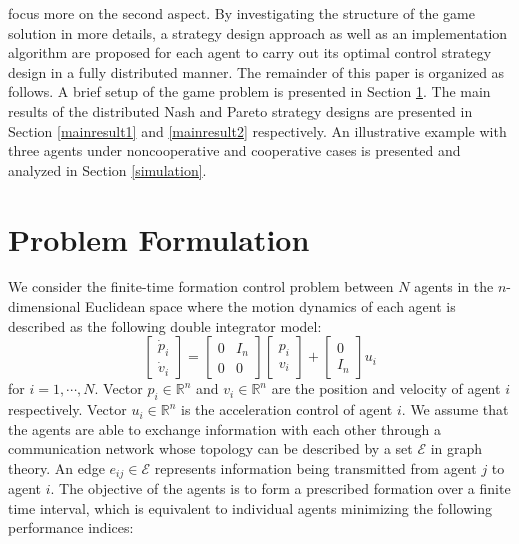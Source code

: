 \documentclass[12pt,draftcls,onecolumn]{IEEEtran}  %
\begin{document}
focus more on the second aspect. By investigating the structure of the game solution in more details, a strategy design approach as well as {an} implementation algorithm {are} proposed for each agent to carry out its optimal control strategy design in a fully distributed manner. The {remainder} of this paper is organized as follows. A brief setup of the game {problem} is presented in Section \ref{setup}. The main results of the distributed Nash and Pareto strategy {designs} are presented in Section \ref{mainresult1} and \ref{mainresult2} {respectively}. An illustrative example with three agents under noncooperative and cooperative cases is presented and analyzed in Section \ref{simulation}.


\section{Problem Formulation}\label{setup}
We consider the {finite-time} formation control problem between $N$ agents in the $n$-dimensional Euclidean space where the motion dynamics of each agent is described as the following double integrator model:
\begin{equation}
\begin{bmatrix}
\dot{p}_i\\ \dot{v}_i
\end{bmatrix}=\begin{bmatrix}
0&I_n\\0&0
\end{bmatrix}\begin{bmatrix}
p_i\\
v_i\end{bmatrix}+\begin{bmatrix}
0\\ I_n
\end{bmatrix}u_i\label{systemxi}
\end{equation}
for $i=1,\cdots,N$. {Vector $p_i\in\mathbb{R}^n$ and $v_i\in\mathbb{R}^n$ are the position and velocity of agent $i$ respectively.} Vector $u_i\in\mathbb{R}^{n}$ is the acceleration control of agent $i$. We assume that the agents are able to exchange information with each other through a communication network {whose topology can be described by a set $\mathcal{E}$ in graph theory. An edge $e_{ij}\in\mathcal{E}$ represents information being transmitted from agent $j$ to agent $i$}. The objective of the agents is to form a prescribed formation over a finite time interval, which is equivalent to individual agents minimizing the following performance indices:
\end{document}
